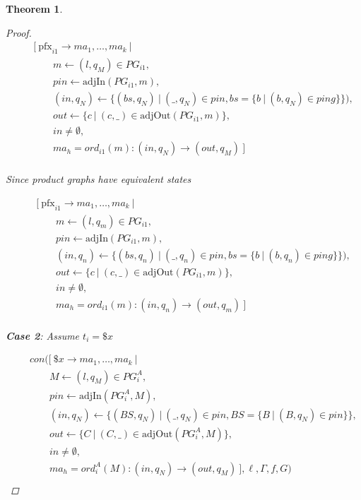 \documentclass[twocolumn, openany]{sig-alternate-10pt}
\newcommand{\Pfx}{\mathrm{pfx}}%
\newtheorem{thm}{Theorem}
\begin{document}
\begin{thm}
\begin{proof}
  \[ \begin{array}{l}
     ~~~~~~~~~ [~ \Pfx_{i1} \rightarrow ma_1, \dots, ma_k ~\vert~ \\
     ~~~~~~~~~~~~~~~~~~ m \leftarrow (l,q_M) \in PG_{i1}, \\
     ~~~~~~~~~~~~~~~~~~ pin \leftarrow \text{adjIn}(PG_{i1},m), \\
     ~~~~~~~~~~~~~~~~~~ (in,q_N) \leftarrow \{ (bs,q_N) ~\vert~ (\_,q_N) \in pin, bs=\{ b ~\vert~ (b,q_N) \in ping \} \}), \\
     ~~~~~~~~~~~~~~~~~~ out \leftarrow \{ c ~\vert~ (c,\_) \in \text{adjOut}(PG_{i1},m) \}, \\
     ~~~~~~~~~~~~~~~~~~ in \neq \emptyset, \\
     ~~~~~~~~~~~~~~~~~~ ma_h = ord_{i1}(m) : (in,q_N) \rightarrow (out,q_M) ~] \\
  \end{array} \]%

  Since product graphs have equivalent states

  \[ \begin{array}{l}
     ~~~~~~~~~ [~ \Pfx_{i1} \rightarrow ma_1, \dots, ma_k ~\vert~ \\
     ~~~~~~~~~~~~~~~~~~ m \leftarrow (l,q_m) \in PG_{i1}, \\
     ~~~~~~~~~~~~~~~~~~ pin \leftarrow \text{adjIn}(PG_{i1},m), \\
     ~~~~~~~~~~~~~~~~~~ (in,q_n) \leftarrow \{ (bs,q_n) ~\vert~ (\_,q_n) \in pin, bs=\{ b ~\vert~ (b,q_n) \in ping \} \}), \\
     ~~~~~~~~~~~~~~~~~~ out \leftarrow \{ c ~\vert~ (c,\_) \in \text{adjOut}(PG_{i1},m) \}, \\
     ~~~~~~~~~~~~~~~~~~ in \neq \emptyset, \\
     ~~~~~~~~~~~~~~~~~~ ma_h = ord_{i1}(m) : (in,q_n) \rightarrow (out,q_m) ~] \\
  \end{array} \]%

  \vspace{1em}
  \textbf{Case 2}: Assume $t_i = \$x$

  \[ \begin{array}{l}
     ~~~~~~~~~ con([~ \$x \rightarrow ma_1, \dots, ma_k ~\vert~ \\
     ~~~~~~~~~~~~~~~~~~ M \leftarrow (l,q_M) \in PG^A_i, \\
     ~~~~~~~~~~~~~~~~~~ pin \leftarrow \text{adjIn}(PG^A_i,M), \\
     ~~~~~~~~~~~~~~~~~~ (in,q_N) \leftarrow \{ (BS,q_N) ~\vert~ (\_,q_N) \in pin, BS=\{B ~\vert~ (B,q_N) \in pin \} \}, \\
     ~~~~~~~~~~~~~~~~~~ out \leftarrow \{ C ~\vert~ (C,\_) \in \text{adjOut}(PG^A_i,M) \}, \\
     ~~~~~~~~~~~~~~~~~~ in \neq \emptyset, \\
     ~~~~~~~~~~~~~~~~~~ ma_h = ord^A_i(M) : (in,q_N) \rightarrow (out,q_M) ~],\ell,\Gamma,f,G) \\
  \end{array} \]%


\end{proof}
\end{thm}
\end{document}

